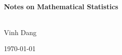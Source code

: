 \begin{titlepage}
	\vbox{ }
	
	\vbox{ }
	
	\begin{center}
		
		\vbox{ }
		\HRule \\[0.4cm]
		{ \huge \bfseries Notes on Mathematical Statistics}\\[0.4cm]
		\HRule \\[1.5cm]

			\begin{center} \large
				Vinh Dang
			\end{center}

		
		\vfill
		{\large \today}
	\end{center}
\end{titlepage}
